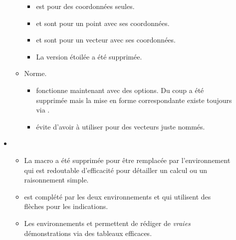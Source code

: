 \documentclass[12pt,a4paper]{book}
\begin{document}
\begin{description}
\begin{itemize}[itemsep=.5em]
\begin{itemize}[itemsep=.5em]
\begin{itemize}[itemsep=.5em, label=$\rightarrow$]
                \item {} est pour des coordonnées seules.
    
                \item {} et  sont pour un point avec ses coordonnées.
    
                \item {} et  sont pour un vecteur avec ses coordonnées.
    
                \item La version étoilée  a été supprimée. 
    	    \end{itemize}
    
    
    
            \item Norme.
            
            \begin{itemize}[itemsep=.5em, label=$\rightarrow$]
                \item {} fonctionne maintenant avec des options.
                      Du coup  a été supprimée mais la mise en forme correspondante existe toujours via .
    
    			\item {} évite d'avoir à utiliser  pour des vecteurs juste nommés.
    	    \end{itemize}
        \end{itemize}
    
    
    
    
        \separation
        \item {}
        \begin{itemize}[itemsep=.5em]
            \item La macro  a été supprimée pour être remplacée par l'environnement  qui est redoutable d'efficacité pour détailler un calcul ou un raisonnement simple.
            
            \item {} est complété par les deux environnements  et  qui utilisent des flèches pour les indications.
    
            \item Les environnements  et  permettent de rédiger de \emph{\og vraies \fg} démonstrations via des tableaux efficaces.
    

\end{itemize}
\end{itemize}
\end{description}
\end{document}
